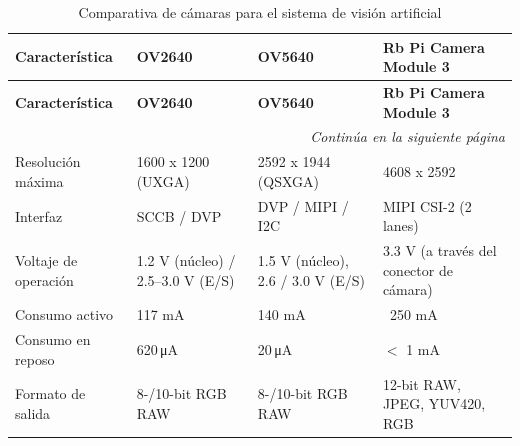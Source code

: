 \renewcommand{\arraystretch}{1.5}
\begin{longtable}{
    |p{3cm}
    |p{3.5cm}
    |p{3.5cm}
    |p{3.5cm}|
}
\caption{Comparativa de cámaras para el sistema de visión artificial} 
\label{tab:cam_comparativa} \\
\hline
\textbf{Característica} & \textbf{OV2640} & \textbf{OV5640} & \textbf{Rb Pi Camera Module 3} \\
\hline
\endfirsthead

\hline
\textbf{Característica} & \textbf{OV2640} & \textbf{OV5640} & \textbf{Rb Pi Camera Module 3}\\
\hline
\endhead

\hline
\multicolumn{4}{r}{\textit{Continúa en la siguiente página}} \\
\endfoot

\hline
\endlastfoot

Resolución máxima 
    & 1600 x 1200 (UXGA) 
    & 2592 x 1944 (QSXGA) 
    & 4608 x 2592 \\ \hline

Interfaz 
    & SCCB / DVP 
    & DVP / MIPI / I2C 
    &MIPI CSI-2 (2 lanes)\\ \hline

Voltaje de operación 
    & 1.2 V (núcleo) / 2.5--3.0 V (E/S) 
    & 1.5 V (núcleo), 2.6 / 3.0 V (E/S) 
    &3.3 V (a través del conector de cámara) \\ \hline

Consumo activo 
    & 117 mA 
    & 140 mA
    &~250 mA  \\ \hline

Consumo en reposo 
    & 620\,\unit{\micro\ampere} 
    & 20\,\unit{\micro\ampere} 
    &$<$ 1 mA \\ \hline

Formato de salida 
    & 8-/10-bit RGB RAW 
    & 8-/10-bit RGB RAW 
    &12-bit RAW, JPEG, YUV420, RGB\\ \hline


\end{longtable}
